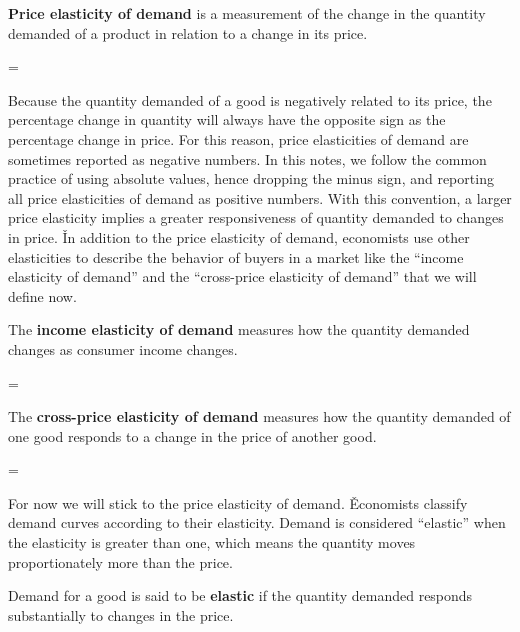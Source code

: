 \textbf{Price elasticity of demand} is a measurement of the change in the quantity demanded of a product in relation
to a change in its price.

\bse
{} = 
{}
\ese
\ed

Because the quantity demanded of a good is negatively related to its price, the percentage change in quantity will
always have the opposite sign as the percentage change in price. For this reason, price elasticities of demand are
sometimes reported as negative numbers. In this notes, we follow the common practice of using absolute values, hence
dropping the minus sign, and reporting all price elasticities of demand as positive numbers. With this convention, a
larger price elasticity implies a greater responsiveness of quantity demanded to changes in price. \v

In addition to the price elasticity of demand, economists use other elasticities to describe the behavior of buyers
in a market like the ``income elasticity of demand'' and the ``cross-price elasticity of demand'' that we will define
now.

The \textbf{income elasticity of demand} measures how the quantity demanded changes as consumer income changes.

\bse
{} = 
{}
\ese
\ed

The \textbf{cross-price elasticity of demand} measures how the quantity demanded of one good responds to a change in
the price of another good.

\bse
{} = 
{}
\ese
\ed

For now we will stick to the price elasticity of demand. \v

Economists classify demand curves according to their elasticity. Demand is considered ``elastic'' when the elasticity
is greater than one, which means the quantity moves proportionately more than the price.

Demand for a good is said to be \textbf{elastic} if the quantity demanded responds substantially to changes in the
price.

